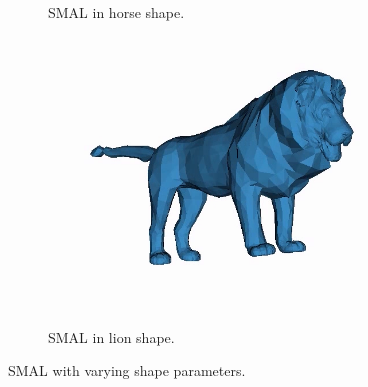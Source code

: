 \begin{figure}[H]
\begin{subfigure}{0.3\linewidth}
        \caption{SMAL in horse shape.}
    \end{subfigure}%
    \begin{subfigure}{0.3\linewidth}
        \centering
            \includegraphics[width=1\linewidth]{smal/lion}
            \caption{SMAL in lion shape.}
    \end{subfigure}%
    \caption{SMAL with varying shape parameters.}
    \label{fig:smal_model_shape}
    \end{figure}

